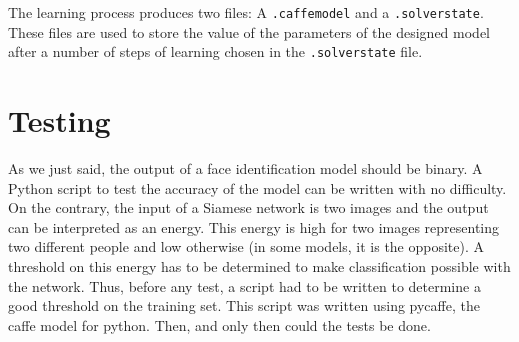 The learning process produces two files: A \texttt{.caffemodel} and a \texttt{.solverstate}. These files are used to store the value of the parameters of the designed model after a number of steps of learning chosen in the \texttt{.solverstate} file.

\section{Testing}

As we just said, the output of a face identification model should be binary. A Python script to test the accuracy of the model can be written with no difficulty. On the contrary, the input of a Siamese network is two images and the output can be interpreted as an energy. This energy is high for two images representing two different people and low otherwise (in some models, it is the opposite). A threshold on this energy has to be determined to make classification possible with the network. Thus, before any test, a script had to be written to determine a good threshold on the training set. This script was written using pycaffe, the caffe model for python. Then, and only then could the tests be done.